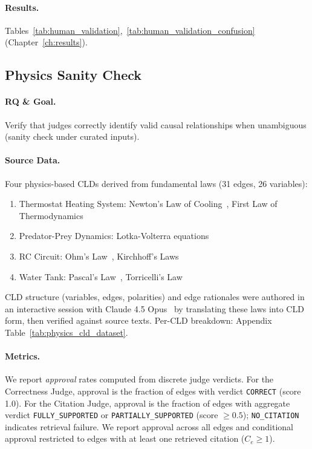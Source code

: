 \paragraph{Results.}
Tables~\ref{tab:human_validation},~\ref{tab:human_validation_confusion} (Chapter~\ref{ch:results}).

\subsection{Physics Sanity Check}
\label{sec:physics_validation}

\paragraph{RQ \& Goal.}
Verify that judges correctly identify valid causal relationships when unambiguous (sanity check under curated inputs).

\paragraph{Source Data.}
Four physics-based CLDs derived from fundamental laws (31 edges, 26 variables):
\begin{enumerate}[noitemsep]
    \item Thermostat Heating System: Newton's Law of Cooling~\cite{newton1701scala}, First Law of Thermodynamics~\cite{clausius1850heat}
    \item Predator-Prey Dynamics: Lotka-Volterra equations~\cite{lotka1925elements,volterra1928fluctuations}
    \item RC Circuit: Ohm's Law~\cite{ohm1827galvanische}, Kirchhoff's Laws~\cite{kirchhoff1845durchgang}
    \item Water Tank: Pascal's Law~\cite{pascal1663equilibre}, Torricelli's Law~\cite{torricelli1644opera}
\end{enumerate}
CLD structure (variables, edges, polarities) and edge rationales were authored in an interactive session with Claude 4.5 Opus~\cite{anthropic2025claude45opus} by translating these laws into CLD form, then verified against source texts. Per-CLD breakdown: Appendix Table~\ref{tab:physics_cld_dataset}.

\paragraph{Metrics.} We report \emph{approval} rates computed from discrete judge verdicts. For the Correctness Judge, approval is the fraction of edges with verdict \texttt{CORRECT} (score 1.0). For the Citation Judge, approval is the fraction of edges with aggregate verdict \texttt{FULLY\_SUPPORTED} or \texttt{PARTIALLY\_SUPPORTED} (score $\ge 0.5$); \texttt{NO\_CITATION} indicates retrieval failure. We report approval across all edges and conditional approval restricted to edges with at least one retrieved citation ($C_e\ge1$).

